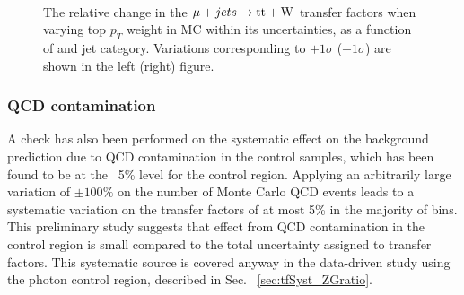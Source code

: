 \begin{figure}[]
  \centering
   ~~
  \\

  \caption{\label{fig:tfSyst_topPt_muToTtw} The relative change in the $\mj \rightarrow \mathrm{tt+W}$ transfer
  factors when varying top $p_{T}$ weight in MC within its uncertainties, as a function of \scalht and jet category. 
  Variations corresponding to $+1\sigma$ ($-1\sigma$) are shown in the left (right) figure. 
  }
\end{figure}


\subsubsection*{QCD contamination}
\label{sec:tfSyst_qcdCont}

A check has also been performed on the systematic effect on the
background prediction due to QCD contamination in the control samples,
which has been found to be at the ~5\% level for the \gj
control region. Applying an arbitrarily large variation of $\pm
100\%$ on the number of Monte Carlo QCD events leads to a systematic
variation on the transfer factors of at most 5\% in the majority of bins.
This preliminary study suggests that effect from QCD
contamination in the \gj control region is small compared 
to the total uncertainty assigned to transfer factors. 
This systematic source is covered anyway in the data-driven study  
using the photon control region, described in Sec. ~\ref{sec:tfSyst_ZGratio}.




